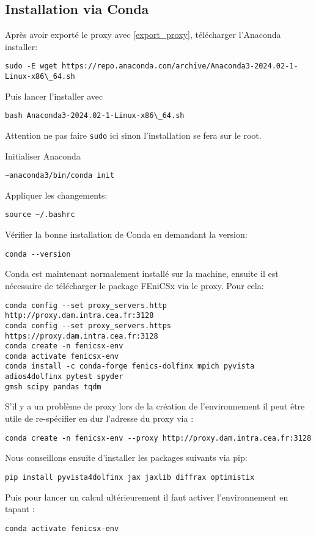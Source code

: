 \documentclass[10pt]{book}
\begin{document}
\subsection{Installation via Conda}\label{Subsection:Conda}
Après avoir exporté le proxy avec \eqref{export_proxy}, télécharger l'Anaconda installer:
\begin{verbatim}
sudo -E wget https://repo.anaconda.com/archive/Anaconda3-2024.02-1-Linux-x86\_64.sh
\end{verbatim}
Puis lancer l'installer avec
\begin{verbatim}
bash Anaconda3-2024.02-1-Linux-x86\_64.sh
\end{verbatim}
\begin{Rem}{Attention ne pas faire \texttt{sudo} ici sinon l'installation se fera sur le root.}\end{Rem}
Initialiser Anaconda
\begin{verbatim}
~anaconda3/bin/conda init
\end{verbatim}
Appliquer les changements:
\begin{verbatim}
source ~/.bashrc
\end{verbatim}
Vérifier la bonne installation de Conda en demandant la version:
\begin{verbatim}
conda --version
\end{verbatim}
Conda est maintenant normalement installé sur la machine, ensuite il est nécessaire de télécharger le package FEniCSx via le proxy. Pour cela:
\begin{verbatim}
conda config --set proxy_servers.http http://proxy.dam.intra.cea.fr:3128
conda config --set proxy_servers.https https://proxy.dam.intra.cea.fr:3128
conda create -n fenicsx-env
conda activate fenicsx-env
conda install -c conda-forge fenics-dolfinx mpich pyvista adios4dolfinx pytest spyder 
gmsh scipy pandas tqdm
\end{verbatim}
S'il y a un problème de proxy lors de la création de l'environnement il peut être utile de re-spécifier en dur l'adresse du proxy via :
\begin{verbatim}
conda create -n fenicsx-env --proxy http://proxy.dam.intra.cea.fr:3128
\end{verbatim}
Nous conseillons ensuite d'installer les packages suivants via pip:
\begin{verbatim}
pip install pyvista4dolfinx jax jaxlib diffrax optimistix
\end{verbatim}
Puis pour lancer un calcul ultérieurement il faut activer l'environnement en tapant :
\begin{verbatim}
conda activate fenicsx-env
\end{verbatim}
\end{document}
